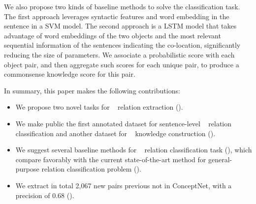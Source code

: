 We also propose two kinds of baseline methods to solve the classification task.
The first approach leverages syntactic features and word embedding
in the sentence in a SVM model. 
The second approach is a LSTM
model that takes advantage of word embeddings of the 
two objects and the most relevant sequential information of the sentences 
indicating the co-location, significantly reducing the size of 
parameters. 
We associate a probabilistic score with each object pair,
and then aggregate such scores for each unique pair,
to produce a commonsense knowledge score for this pair.  

In summary, this paper makes the following contributions:
\begin{itemize}
	\item We propose two novel tasks for \lnear~ relation extraction
	().
	\item We make public the first annotated dataset for 
	sentence-level \lnear~ relation classification and another dataset for
	\lnear~ knowledge construction (). 
	\item We suggest several baseline methods for \lnear~ relation 
	classification task (), 
	which compare favorably with the current state-of-the-art
	method for general-purpose relation classification problem (). 
	
	\item We extract in total 2,067 new pairs previous not in
	ConceptNet, with a precision of 0.68 ().
\end{itemize}


